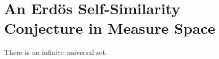 \section{An Erd\"{o}s Self-Similarity Conjecture in Measure Space}
\begin{conjecture}
    There is no infinite universal set. 
\end{conjecture}

